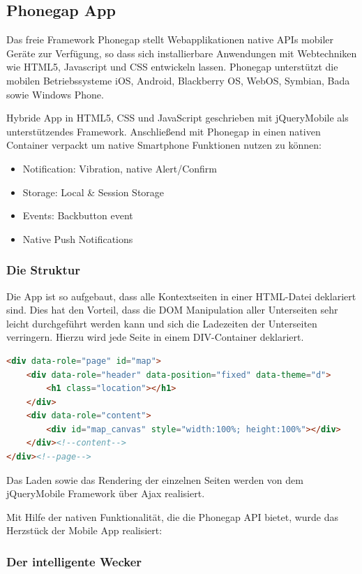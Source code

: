 \documentclass{report}
\begin{document}
\subsection{Phonegap App}
Das freie Framework Phonegap stellt Webapplikationen native APIs mobiler Geräte zur Verfügung, so dass sich installierbare Anwendungen mit Webtechniken wie HTML5, Javascript und CSS entwickeln lassen. Phonegap unterstützt die mobilen Betriebssysteme iOS, Android, Blackberry OS, WebOS, Symbian, Bada sowie Windows Phone.

Hybride App in HTML5, CSS und JavaScript geschrieben mit jQueryMobile als unterstützendes Framework.
Anschließend mit Phonegap in einen nativen Container verpackt um native Smartphone Funktionen nutzen zu können:
\begin{itemize}
\item Notification: Vibration, native Alert/Confirm
\item Storage: Local \& Session Storage
\item Events: Backbutton event
\item Native Push Notifications
\end{itemize}

\subsubsection{Die Struktur}
Die App ist so aufgebaut, dass alle Kontextseiten in einer HTML-Datei deklariert sind. Dies hat den Vorteil, dass die DOM Manipulation aller Unterseiten sehr leicht durchgeführt werden kann und sich die Ladezeiten der Unterseiten verringern.
Hierzu wird jede Seite in einem DIV-Container deklariert.
\begin{lstlisting}[language=HTML, deletekeywords={content}, caption=Deklarierung einer Seite, label=cbsp8]
<div data-role="page" id="map">
	<div data-role="header" data-position="fixed" data-theme="d">
		<h1 class="location"></h1>
	</div>
	<div data-role="content">
		<div id="map_canvas" style="width:100%; height:100%"></div>	
	</div><!--content-->
</div><!--page-->
\end{lstlisting}
Das Laden sowie das Rendering der einzelnen Seiten werden von dem jQueryMobile Framework über Ajax realisiert.

Mit Hilfe der nativen Funktionalität, die die Phonegap API bietet, wurde das Herzstück der Mobile App realisiert:


\subsubsection{Der intelligente Wecker}
\end{document}

